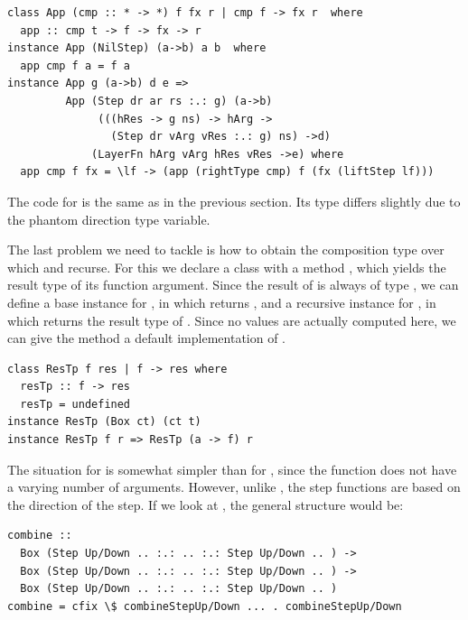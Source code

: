 \documentclass{llncs}
\begin{document}
\begin{small}
\begin{verbatim}
class App (cmp :: * -> *) f fx r | cmp f -> fx r  where
  app :: cmp t -> f -> fx -> r
instance App (NilStep) (a->b) a b  where
  app cmp f a = f a
instance App g (a->b) d e =>
         App (Step dr ar rs :.: g) (a->b) 
              (((hRes -> g ns) -> hArg -> 
                (Step dr vArg vRes :.: g) ns) ->d) 
             (LayerFn hArg vArg hRes vRes ->e) where
  app cmp f fx = \lf -> (app (rightType cmp) f (fx (liftStep lf))) 
\end{verbatim}
\end{small}

The code for  is the same as in the previous section. Its type differs slightly due to the phantom direction type variable.

The last problem we need to tackle is how to obtain the composition type over which  and  recurse. For this we declare a class  with a method , which yields the result type of its function argument. Since the result of  is always of type , we can define a base instance for , in which  returns , and a recursive instance for , in which  returns the result type of . Since no values are actually computed here, we can give the method a default implementation of .


\begin{small}
\begin{verbatim}
class ResTp f res | f -> res where
  resTp :: f -> res
  resTp = undefined
instance ResTp (Box ct) (ct t)
instance ResTp f r => ResTp (a -> f) r
\end{verbatim}
\end{small}

The situation for  is somewhat simpler than for , since the function does not have a varying number of arguments. However, unlike , the step functions are based on the direction of the step. If we look at , the general structure would be:

\begin{small}
\begin{verbatim}
combine :: 
  Box (Step Up/Down .. :.: .. :.: Step Up/Down .. ) ->
  Box (Step Up/Down .. :.: .. :.: Step Up/Down .. ) ->
  Box (Step Up/Down .. :.: .. :.: Step Up/Down .. )
combine = cfix \$ combineStepUp/Down ... . combineStepUp/Down 
\end{verbatim}%
\end{small}
\end{document}
